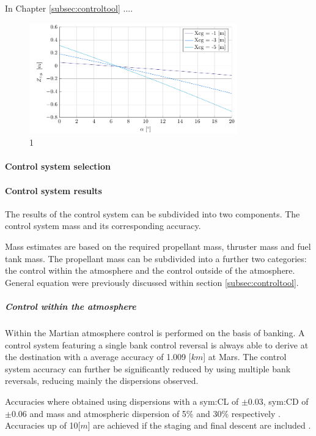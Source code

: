 
In Chapter \ref{subsec:controltool} ....



\begin{figure}[h]
	\centering
	\includegraphics[width=0.8\textwidth]{./Figure/control/moment}
	\caption{1}
	\label{fig:}
\end{figure}


\paragraph{Control system selection}



\paragraph{Control system results}

The results of the control system can be subdivided into two components. The control system mass and its corresponding accuracy.

Mass estimates are based on the required propellant mass, thruster mass and fuel tank mass. The propellant mass can be subdivided into a further two categories: the control within the atmosphere and the control outside of the atmosphere. General equation were previously discussed within section \ref{subsec:controltool}.

\subparagraph{Control within the atmosphere} 

Within the Martian atmosphere control is performed on the basis of banking. A control system featuring a single bank control reversal is always able to derive at the destination with a average accuracy of 1.009 [$km$]\cite{Lu2007} at Mars. The control system accuracy can further be significantly reduced by using multiple bank reversals, reducing mainly the dispersions observed. 

Accuracies where obtained using dispersions with a \gls{sym:CL} of $\pm 0.03 $, \gls{sym:CD}  of $\pm 0.06 $ and mass and atmospheric dispersion of 5\% and 30\% respectively \cite{Lu2007}. Accuracies up of 10[$m$] are achieved if the staging and final descent are included \cite{Davis2010}. 

